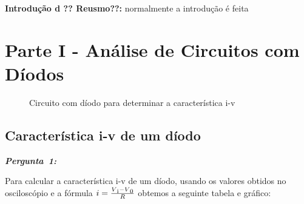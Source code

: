 \documentclass[pdftex,12pt,a4paper]{report}
\begin{document}
 

\renewcommand{\headrulewidth}{0pt}

\vspace*{\fill}
\textbf{Introdução  d  ?? Reusmo??:}
\begingroup
normalmente a introdução é feita 
\endgroup
\vspace*{\fill}
\newpage

\renewcommand*\contentsname{Conteúdos}
\renewcommand*\figurename{Figura}
\renewcommand*\tablename{Tabela}

\tableofcontents
\renewcommand{\headrulewidth}{0.15pt}
\renewcommand{\thechapter}{}

\clearpage

\section{Parte I - Análise de Circuitos com Díodos}
\begin{figure}[h]
\centerline{}
\caption{Circuito com díodo para determinar a característica i-v}\label{diodo_parte1}
\end{figure}

\subsection{Característica i-v de um díodo} 
\hbox{\emph{\textbf{Pergunta 1:}}\newline\newline}

Para calcular a característica i-v de um díodo, usando os valores obtidos no osciloscópio e a fórmula $i = \frac{V\textsubscript{i}-V\textsubscript{0}}{R}$ obtemos a seguinte tabela e gráfico:\newline

\endminipage\hfill
{}
\endminipage\hfill
\end{document}
